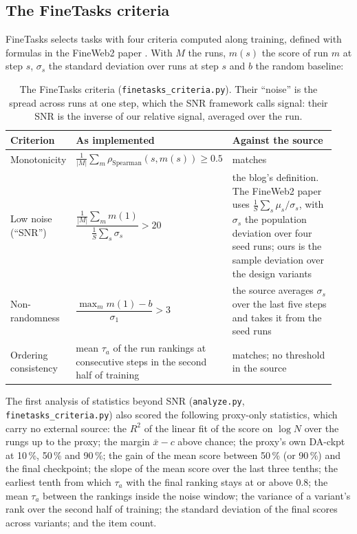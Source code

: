 \subsection{The FineTasks criteria}
\label{app:sur-finetasks}

FineTasks \citep{kydlicek_finetasks_nodate} selects tasks with four criteria computed along training, defined with formulas in the FineWeb2 paper \citep{penedo_fineweb2_2025}.
With $M$ the runs, $m(s)$ the score of run $m$ at step $s$, $\sigma_s$ the standard deviation over runs at step $s$ and $b$ the random baseline:

\begin{table}[h]
\centering
\scriptsize
\begin{tabular}{@{}p{0.14\linewidth}p{0.33\linewidth}p{0.47\linewidth}@{}}
\toprule
\textbf{Criterion} & \textbf{As implemented} & \textbf{Against the source} \\
\midrule
Monotonicity & $\frac{1}{|M|}\sum_{m}\rho_{\text{Spearman}}(s, m(s)) \geq 0.5$ & matches \\
Low noise (``SNR'') & $\dfrac{\frac{1}{|M|}\sum_m m(1)}{\frac{1}{S}\sum_s \sigma_s} > 20$ & the blog's definition. The FineWeb2 paper uses $\frac{1}{S}\sum_s \mu_s/\sigma_s$, with $\sigma_s$ the population deviation over four seed runs; ours is the sample deviation over the design variants \\
Non-randomness & $\dfrac{\max_m m(1) - b}{\sigma_{1}} > 3$ & the source averages $\sigma_s$ over the last five steps and takes it from the seed runs \\
Ordering consistency & mean $\tau_a$ of the run rankings at consecutive steps in the second half of training & matches; no threshold in the source \\
\bottomrule
\end{tabular}
\caption{The FineTasks criteria (\texttt{finetasks\_criteria.py}). Their ``noise'' is the spread across runs at one step, which the SNR framework calls signal: their SNR is the inverse of our relative signal, averaged over the run.}
\label{tab:sur-finetasks}
\end{table}

The first analysis of statistics beyond SNR (\texttt{analyze.py}, \texttt{finetasks\_criteria.py}) also scored the following proxy-only statistics, which carry no external source: the $R^2$ of the linear fit of the score on $\log N$ over the rungs up to the proxy; the margin $\bar{x} - c$ above chance; the proxy's own DA-ckpt at 10\,\%, 50\,\% and 90\,\%; the gain of the mean score between 50\,\% (or 90\,\%) and the final checkpoint; the slope of the mean score over the last three tenths; the earliest tenth from which $\tau_a$ with the final ranking stays at or above 0.8; the mean $\tau_a$ between the rankings inside the noise window; the variance of a variant's rank over the second half of training; the standard deviation of the final scores across variants; and the item count.

